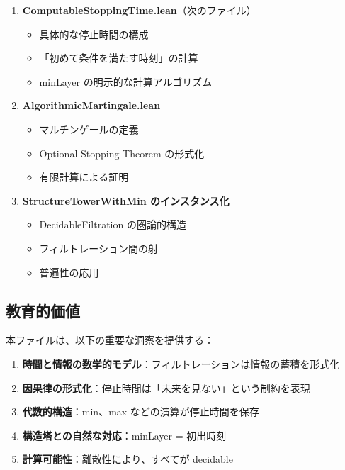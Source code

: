 \documentclass[12pt,a4paper,ja=standard]{bxjsarticle}
\theoremstyle{definition}
\begin{document}
\begin{enumerate}
    \item \textbf{ComputableStoppingTime.lean}（次のファイル）
    \begin{itemize}
        \item 具体的な停止時間の構成
        \item 「初めて条件を満たす時刻」の計算
        \item minLayer の明示的な計算アルゴリズム
    \end{itemize}
    
    \item \textbf{AlgorithmicMartingale.lean}
    \begin{itemize}
        \item マルチンゲールの定義
        \item Optional Stopping Theorem の形式化
        \item 有限計算による証明
    \end{itemize}
    
    \item \textbf{StructureTowerWithMin のインスタンス化}
    \begin{itemize}
        \item DecidableFiltration の圏論的構造
        \item フィルトレーション間の射
        \item 普遍性の応用
    \end{itemize}
\end{enumerate}

\subsection{教育的価値}

\begin{insight}
本ファイルは、以下の重要な洞察を提供する：

\begin{enumerate}
    \item \textbf{時間と情報の数学的モデル}：フィルトレーションは情報の蓄積を形式化
    \item \textbf{因果律の形式化}：停止時間は「未来を見ない」という制約を表現
    \item \textbf{代数的構造}：min、max などの演算が停止時間を保存
    \item \textbf{構造塔との自然な対応}：minLayer = 初出時刻
    \item \textbf{計算可能性}：離散性により、すべてが decidable
\end{enumerate}
\end{insight}
\end{document}
